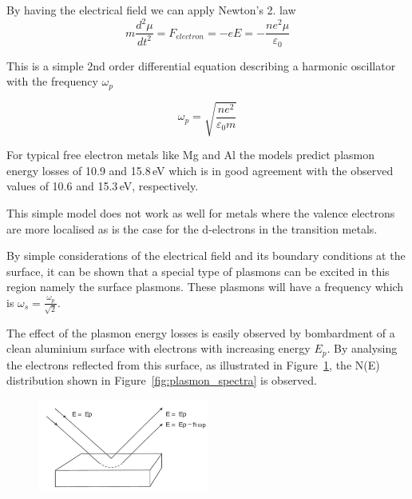 By having the electrical field we can apply Newton's 2. law
\begin{equation}
m\frac{d^{2}\mu}{dt^2}= F_{electron}=-eE=-\frac{ne^2\mu}{\varepsilon_0}
\end{equation}

This is a simple 2nd order differential equation describing a harmonic oscillator with the frequency $\omega_{p}$

\begin{equation}
\omega_p = \sqrt{\frac{ne^2}{\varepsilon_0 m}}
\end{equation}

For typical free electron metals like Mg and Al the models predict plasmon energy losses of 10.9 and 15.8\,eV which is in good agreement with the observed values of 10.6 and 15.3\,eV, respectively.

This simple model does not work as well for metals where the valence electrons are more localised as is the case for the d-electrons in the transition metals.

By simple considerations of the electrical field and its boundary conditions at the surface, it can be shown that a special type of plasmons can be excited in this region namely the surface plasmons. These plasmons will have a frequency which is $\omega_{s} = \frac{\omega_{p}}{\sqrt{2}}$.

The effect of the plasmon energy losses is easily observed by bombardment of a clean aluminium surface with electrons with increasing energy $E_{p}$. By analysing the electrons reflected from this surface, as illustrated in Figure~\ref{fig:plasmon_loss}, the N(E) distribution shown in Figure~\ref{fig:plasmon_spectra} is observed.
\begin{figure}[htbp]
\centering
\includegraphics[width=0.5\textwidth]{figures/02_08}
\caption{ }
\label{fig:plasmon_loss}
\end{figure}

